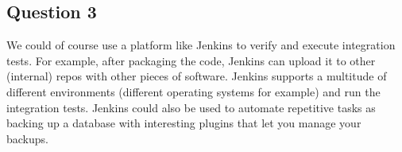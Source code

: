 \subsection*{Question 3}
\noindent We could of course use a platform like Jenkins to verify and execute integration tests. For example, after packaging the code, Jenkins can upload it to other (internal) repos with other pieces of software. Jenkins supports a multitude of different environments (different operating systems for example) and run the integration tests. Jenkins could also be used to automate repetitive tasks as backing up a database with interesting plugins that let you manage your backups. 